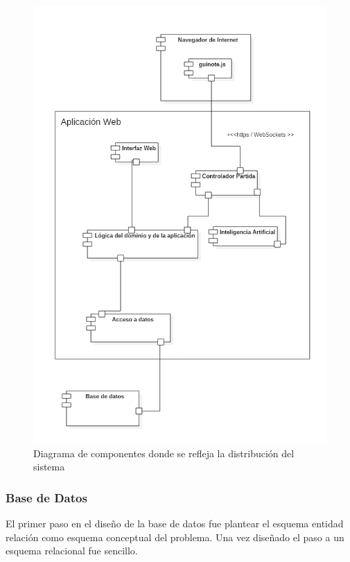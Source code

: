 \begin{figure}[H]
\centering
\includegraphics[scale = 0.5]{figuras/diagramaComponentes.png}
\caption{Diagrama de componentes donde se refleja la distribución del sistema}
\label{fig:diagramaComponentes}
\end{figure}

\subsubsection{Base de Datos}
El primer paso en el diseño de la base de datos fue plantear el esquema entidad relación como esquema conceptual del problema. Una vez diseñado el paso a un esquema relacional fue sencillo.

